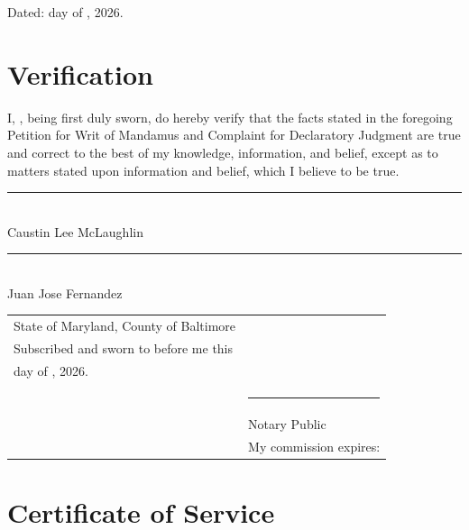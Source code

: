 \documentclass[12pt,letterpaper]{article}
\begin{document}
\vspace{0.2in}
\noindent Dated: \underline{\hspace{0.4in}} day of
\underline{\hspace{1.4in}}, 2026.

\section{Verification}

I, \underline{\hspace{2.6in}}, being first duly sworn, do hereby verify that
the facts stated in the foregoing Petition for Writ of Mandamus and Complaint
for Declaratory Judgment are true and correct to the best of my knowledge,
information, and belief, except as to matters stated upon information and
belief, which I believe to be true.

\vspace{0.3in}
\noindent\rule{2.8in}{0.4pt}\\
Caustin Lee McLaughlin

\vspace{0.3in}
\noindent\rule{2.8in}{0.4pt}\\
Juan Jose Fernandez

\vspace{0.3in}
\noindent
\begin{tabular}{@{}p{3.2in}p{2.6in}@{}}
State of Maryland, County of Baltimore & \\[6pt]
Subscribed and sworn to before me this & \\[6pt]
\underline{\hspace{0.6in}} day of \underline{\hspace{1.2in}}, 2026. & \\[6pt]
& \rule{2.5in}{0.4pt}\\
& Notary Public\\
& My commission expires: \underline{\hspace{1.2in}}\\
\end{tabular}

\section{Certificate of Service}
\end{document}
